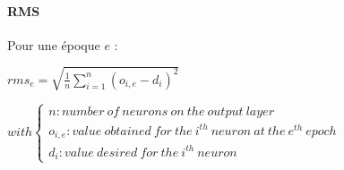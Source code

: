 \paragraph{RMS} \label{rms}
  Pour une époque $e$ :
  \begin{center}
    \begin{large}
    $ rms_{e} = \sqrt{ \frac{1}{n} \sum \limits_{i=1}^{n} 
    ( o_{i,e} - d_{i} )^2 } $
    \end{large}
  $ with \left\lbrace \begin{array}{lll} n : number\ of\ neurons\ on\ the\ output\ 
  layer\\o_{i,e} : value\ obtained\ for\ the\ i^{th}\ neuron\ at\ the\ e^{th}\ epoch\\d_{i} : 
  value\ desired \ for\ the\ i^{th}\ neuron\end{array} \right.$
  \end{center}